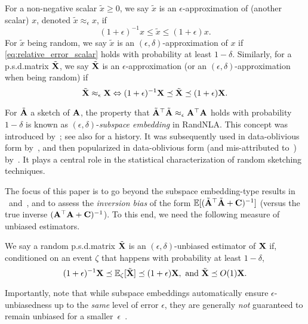 \documentclass[11pt,a4paper]{article}
\begin{document}
\begin{definition}\label{def:rela_error_approxi}
For a non-negative scalar $\tilde x \geq 0$, we say $\tilde x$ is an $\epsilon$-approximation of (another scalar) $x$, denoted $\tilde x \approx_{\epsilon} x$, if
\begin{equation}\label{eq:relative_error_scalar}
  ({1+\epsilon})^{-1} x \leq \tilde x \leq (1+\epsilon)x.
\end{equation}
For $\tilde x$ being random, we say $\tilde x$ is an $(\epsilon,\delta)$-approximation of $x$ if \eqref{eq:relative_error_scalar} holds with probability at least $1-\delta$.
Similarly, for a p.s.d.\@ matrix $\tilde {\mathbf{X}}$, we say $\tilde {\mathbf{X}}$ is an $\epsilon$-approximation (or an $(\epsilon,\delta)$-approximation when being random) if
\begin{equation}
     \tilde {\mathbf{X}} \approx_{\epsilon} \mathbf{X} \Leftrightarrow (1+\epsilon)^{-1}\mathbf{X}\preceq \tilde {\mathbf{X}} \preceq(1+\epsilon)\mathbf{X}.
\end{equation}
\end{definition}

\begin{remark}\normalfont\label{rem:subspace_embed}
For $\tilde {\mathbf{A}}$ a sketch of $\mathbf{A}$, the property that $\tilde {\mathbf{A}}^\top \tilde {\mathbf{A}} \approx_{\epsilon} \mathbf{A}^\top \mathbf{A}$ holds with probability $1-\delta$ is known as $(\epsilon,\delta)$-\emph{subspace embedding} in RandNLA. 
This concept was introduced by~\citet{drineas2006sampling}; see also \citet{mahoney2011randomized} for a history. 
It was subsequently used in data-oblivious form by~\citet{Sarlos06,drineas2011faster}, and then popularized in data-oblivious form (and mis-attributed to~\citet{Sarlos06}) by~\citet{david2014sketching}. 
It plays a central role in the statistical characterization of random sketching techniques.
\end{remark}

The focus of this paper is to go beyond the subspace embedding-type results in ~and~, and to assess the \emph{inversion bias} of the form ${\mathbb{E}}[ (\tilde{\mathbf{A}}^\top\tilde{\mathbf{A}} + \mathbf{C})^{-1}]$ (versus the true inverse $(\mathbf{A}^\top \mathbf{A} + \mathbf{C})^{-1}$).
To this end, we need the following measure of unbiased estimators.

\begin{definition}\label{def:unbiased_estimator}
We say a random p.s.d.\@ matrix $\tilde {\mathbf{X}}$ is an $(\epsilon,\delta)$-unbiased estimator of $\mathbf{X}$ if, conditioned on an event $\zeta$ that happens with probability at least $1-\delta$, 
\begin{equation}
   (1+\epsilon)^{-1}\mathbf{X} \preceq  {\mathbb{E}}_{\zeta}[\tilde {\mathbf{X}}]\preceq   (1+\epsilon)\mathbf{X},~\text{and}~\tilde {\mathbf{X}}\preceq O(1) \mathbf{X}. 
\end{equation}
\end{definition}
Importantly, note that while subspace embeddings automatically ensure $\epsilon$-unbiasedness up to the \emph{same} level of error $\epsilon$, they are generally \emph{not} guaranteed to remain unbiased for a smaller~$\epsilon$~\citep{derezinski2021sparse}.
\end{document}
